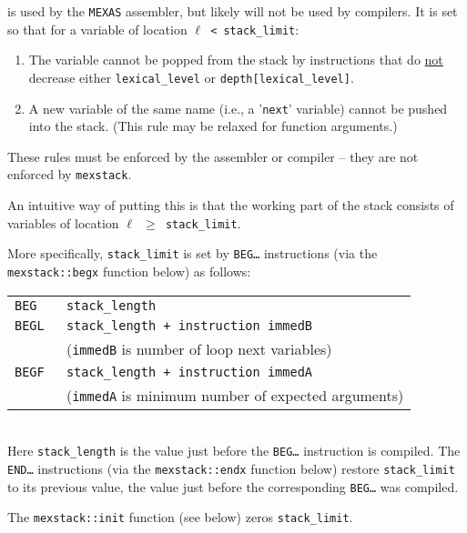\documentclass[12pt]{article}
\begin{document}
\begin{indpar}
 is used by the {\tt MEXAS} assembler, but likely will not be
used by compilers.
It is set so that for a variable of location
{\tt $\ell$ < stack\_limit}\label{STACK-LIMIT}:
\begin{enumerate}
\item The variable cannot be popped from the stack by instructions
that do \underline{not} decrease either {\tt lexical\_level} or
{\tt depth[lexical\_level]}.
\item A new variable of the same name (i.e., a '{\tt next}' variable)
cannot be pushed into the stack.  (This rule may be relaxed for
function arguments.)
\end{enumerate}

These rules must be enforced by the assembler or
compiler -- they are not enforced
by {\tt mexstack}.

An intuitive way of putting this is that the working part of the
stack consists of variables of location {\tt $\ell$ $\geq$ stack\_limit}.

More specifically, {\tt stack\_limit} is set by {\tt BEG\ldots}
instructions (via the {\tt mexstack::\EOL begx} function below) as follows: \\
\hspace*{3em}\begin{tabular}{@{}ll}
\tt BEG & \tt stack\_length \\
\tt BEGL & \tt stack\_length + {\rm instruction} immedB \\
         & ({\tt immedB} is number of loop next variables) \\
\tt BEGF & \tt stack\_length + {\rm instruction} immedA \\
         & ({\tt immedA} is minimum number of expected arguments) \\
\end{tabular} \\
Here {\tt stack\_length} is the value just before the {\tt BEG\ldots}
instruction is compiled.
The {\tt END\ldots} instructions (via the {\tt mexstack::endx} function below)
restore {\tt stack\_\EOL limit} to its previous value, the value
just before the corresponding {\tt BEG\ldots} was compiled.

The {\tt mexstack::init} function (see below) zeros {\tt stack\_limit}.
\end{indpar}
\end{document}
